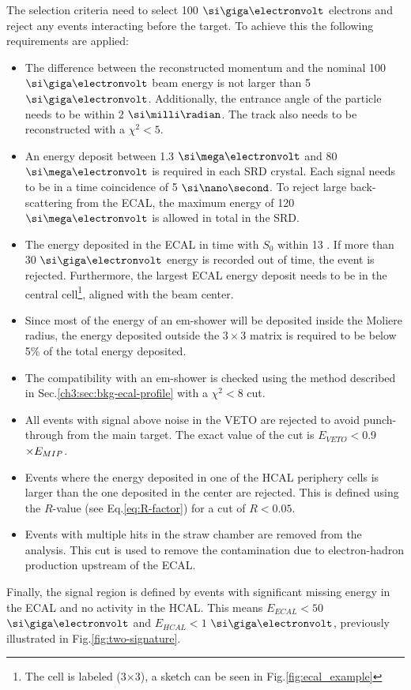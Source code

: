 The selection criteria need to select 100 $\gev$ electrons and reject any events interacting before the target.
To achieve this the following requirements are applied:

\begin{itemize}
\item The difference between the reconstructed momentum and the nominal 100 $\gev$ beam energy is not larger than 5 $\gev$. Additionally, the entrance angle of the particle needs to be within 2 $\mrad$. The track also needs to be reconstructed with a $\chi^2<5$.
\item An energy deposit between 1.3 $\mev$ and 80 $\mev$ is required in each SRD crystal. Each signal needs to be in a time coincidence of 5 $\nas$. To reject large back-scattering from the ECAL, the maximum energy of 120 $\mev$ is allowed in total in the SRD.
\item The energy deposited in the ECAL in time with $S_0$ within 13 \nas. If more than 30 $\gev$ energy is recorded out of time, the event is rejected. Furthermore, the largest ECAL energy deposit needs to be in the central cell\footnote{The cell is labeled (3$\times$3), a sketch can be seen in Fig.\ref{fig:ecal_example}}, aligned with the beam center. 
\item Since most of the energy of an em-shower will be deposited inside the Moliere radius, the energy deposited outside the $3\times3$ matrix is required to be below 5\% of the total energy deposited. 
\item The compatibility with an em-shower is checked using the method described in Sec.\ref{ch3:sec:bkg-ecal-profile} with a $\chi^2 < 8$ cut.
\item All events with signal above noise in the VETO are rejected to avoid punch-through from the main target. The exact value of the cut is $E_{VETO} <$0.9$\times E_{MIP}$.
\item Events where the energy deposited in one of the HCAL periphery cells is larger than the one deposited in the center are rejected. This is defined using the $R$-value (see Eq.\ref{eq:R-factor}) for a cut of $R < 0.05$.
\item Events with multiple hits in the straw chamber are removed from the analysis. This cut is used to remove the contamination due to electron-hadron production upstream of the ECAL.
\end{itemize}

Finally, the signal region is defined by events with significant missing energy in the ECAL and no activity in the HCAL. This means $E_{ECAL} < 50$ $\gev$ and $E_{HCAL} < 1$ $\gev$, previously illustrated in Fig.\ref{fig:two-signature}.

